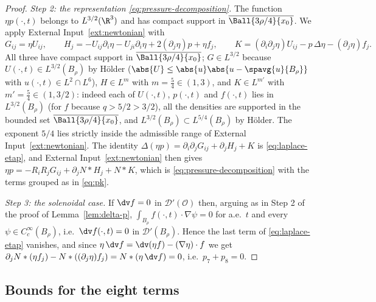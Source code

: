 \documentclass[11pt,reqno]{amsart}
\begin{document}
\begin{proof}
\emph{Step 2: the representation \eqref{eq:pressure-decomposition}.} The
function $\eta p(\cdot,t)$ belongs to $L^{3/2}(\R^{3})$ and has compact support
in $\overline{\Ball{3\rho/4}{x_{0}}}$. We apply
External Input~\ref{ext:newtonian} with
\[
  G_{ij}=\eta U_{ij},\qquad
  H_{j}=-U_{ij}\partial_{i}\eta-U_{ji}\partial_{i}\eta+2(\partial_{j}\eta)p+\eta f_{j},
  \qquad
  K=(\partial_{i}\partial_{j}\eta)U_{ij}-p\,\Delta\eta-(\partial_{j}\eta)f_{j}.
\]
All three have compact support in $\overline{\Ball{3\rho/4}{x_{0}}}$;
$G\in L^{3/2}$ because $U(\cdot,t)\in L^{3/2}(B_{\rho})$ by H\"older
($\abs{U}\le\abs{u}\abs{u-\spavg{u}{B_{\rho}}}$ with $u(\cdot,t)\in L^{2}\cap L^{6}$),
$H\in L^{m}$ with $m=\tfrac54\in(1,3)$, and $K\in L^{m'}$ with $m'=\tfrac54\in(1,3/2)$:
indeed each of $U(\cdot,t)$, $p(\cdot,t)$ and $f(\cdot,t)$ lies in
$L^{3/2}(B_{\rho})$ (for $f$ because $q>5/2>3/2$), all the densities are
supported in the bounded set $\overline{\Ball{3\rho/4}{x_{0}}}$, and
$L^{3/2}(B_{\rho})\subset L^{5/4}(B_{\rho})$ by H\"older. The exponent $5/4$
lies strictly inside the admissible range of
External Input~\ref{ext:newtonian}. The identity $\Delta(\eta p)=\partial_{i}\partial_{j}G_{ij}
+\partial_{j}H_{j}+K$ is \eqref{eq:laplace-etap}, and
External Input~\ref{ext:newtonian} then gives
$\eta p=-R_{i}R_{j}G_{ij}+\partial_{j}N*H_{j}+N*K$, which is
\eqref{eq:pressure-decomposition} with the terms grouped as in \eqref{eq:pk}.

\emph{Step 3: the solenoidal case.} If $\dv f=0$ in
$\mathcal{D}'(\mathcal{O})$ then, arguing as in Step 2 of the proof of
Lemma~\ref{lem:delta-p}, $\int_{B_{\rho}}f(\cdot,t)\cdot\nabla\psi=0$ for a.e.\
$t$ and every $\psi\in C_{c}^{\infty}(B_{\rho})$, i.e.\ $\dv f(\cdot,t)=0$ in
$\mathcal{D}'(B_{\rho})$. Hence the last term of \eqref{eq:laplace-etap}
vanishes, and since
$\eta\,\dv f=\dv(\eta f)-(\nabla\eta)\cdot f$ we get
$\partial_{j}N*(\eta f_{j})-N*((\partial_{j}\eta)f_{j})=N*(\eta\,\dv f)=0$, i.e.\
$p_{7}+p_{8}=0$.
\end{proof}

\subsection{Bounds for the eight terms}\label{ss:pressure-bounds}
\end{document}
